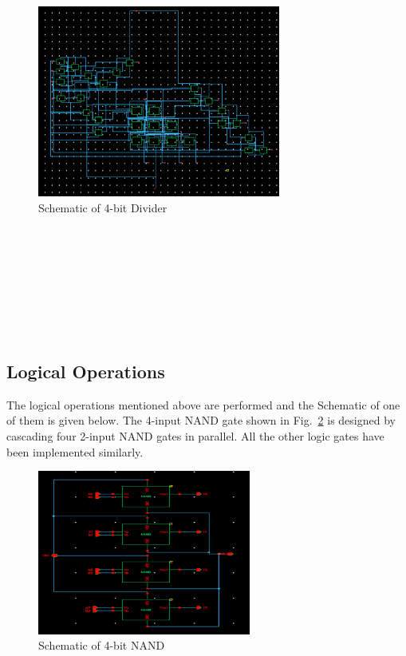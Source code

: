 \documentclass[conference]{IEEEtran}
\begin{document}
\begin{figure}[htbp]
\centerline{\includegraphics[width=8cm,keepaspectratio,]{"4bit_Divider.png"}}
\caption{Schematic of 4-bit  Divider}
\label{fig6}
\end{figure}
\\ \\ \\ \\ \\ \\ \\ 
\subsection{Logical Operations}\label{DB}
The logical operations mentioned above are performed and the Schematic of one of them is given below. The 4-input NAND gate shown in Fig.~\ref{fig7} is designed by cascading four 2-input NAND gates in parallel. All the other logic gates have been implemented similarly.
\begin{figure}[htbp]
\centerline{\includegraphics[width=7cm,keepaspectratio,]{"4bit_NAND.png"}}
\caption{Schematic of 4-bit NAND}
\label{fig7}
\end{figure}
\\ 
\end{document}
